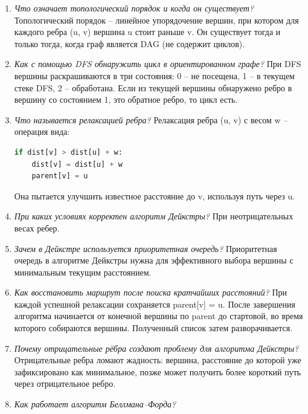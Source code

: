 \begin{enumerate}
	DAG (Directed Acyclic Graph) -- ориентированный граф без ориентированных циклов.
	\item \textit{Что означает топологический порядок и когда он существует?}\newline
	Топологический порядок -- линейное упорядочение вершин, при котором для каждого ребра (u, v) вершина u стоит раньше v. 
	Он существует тогда и только тогда, когда граф является DAG (не содержит циклов).
	\item \textit{Как с помощью DFS обнаружить цикл в ориентированном графе?}\newline
	При DFS вершины раскрашиваются в три состояния: 0 -- не посещена, 1 -- в текущем стеке DFS, 2 -- обработана. 
	Если из текущей вершины обнаружено ребро в вершину со состоянием 1, это обратное ребро, то цикл есть.
	\item \textit{Что называется релаксацией ребра?}\newline
	Релаксация ребра (u, v) с весом w -- операция вида:
\begin{lstlisting}[language=python]
if dist[v] > dist[u] + w: 
	dist[v] = dist[u] + w
	parent[v] = u
\end{lstlisting} 
	Она пытается улучшить известное расстояние до v, используя путь через u.
	\item \textit{При каких условиях корректен алгоритм Дейкстры?}\newline
	При неотрицательных весах ребер.
	\item \textit{Зачем в Дейкстре используется приоритетная очередь?}\newline
	Приоритетная очередь в алгоритме Дейкстры нужна для эффективного выбора вершины с минимальным текущим расстоянием.
	\item \textit{Как восстановить маршрут после поиска кратчайших расстояний?}\newline
	При каждой успешной релаксации сохраняется parent[v] = u. 
	После завершения алгоритма начинается от конечной вершины по parent до стартовой, во время которого собираются вершины.
	Полученный список затем разворачивается.
	\item \textit{Почему отрицательные рёбра создают проблему для алгоритма Дейкстры?}\newline
	Отрицательные ребра ломают жадность: вершина, расстояние до которой уже зафиксировано как минимальное, позже может получить более короткий путь через отрицательное ребро.
	\item \textit{Как работает алгоритм Беллмана–Форда?}\newline

\end{enumerate}
